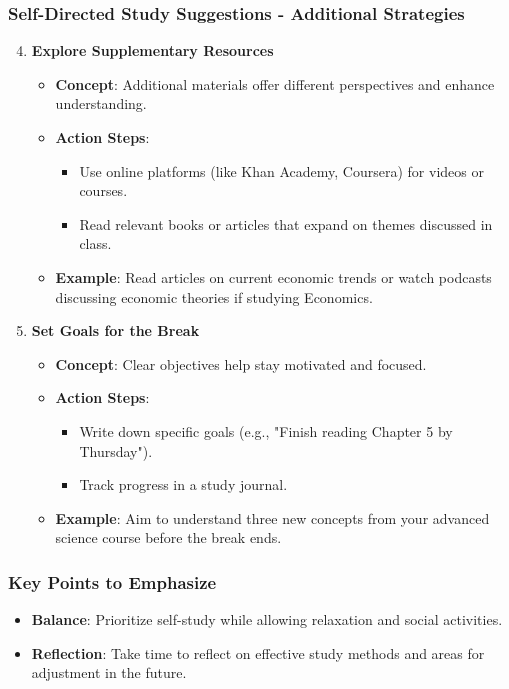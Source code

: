 \documentclass[aspectratio=169]{beamer}
\begin{document}
\begin{frame}[fragile]
    \frametitle{Self-Directed Study Suggestions - Additional Strategies}
    \begin{enumerate}
        \setcounter{enumi}{3}
        \item \textbf{Explore Supplementary Resources}
        \begin{itemize}
            \item \textbf{Concept}: Additional materials offer different perspectives and enhance understanding.
            \item \textbf{Action Steps}:
            \begin{itemize}
                \item Use online platforms (like Khan Academy, Coursera) for videos or courses.
                \item Read relevant books or articles that expand on themes discussed in class.
            \end{itemize}
            \item \textbf{Example}: Read articles on current economic trends or watch podcasts discussing economic theories if studying Economics.
        \end{itemize}

        \item \textbf{Set Goals for the Break}
        \begin{itemize}
            \item \textbf{Concept}: Clear objectives help stay motivated and focused.
            \item \textbf{Action Steps}:
            \begin{itemize}
                \item Write down specific goals (e.g., "Finish reading Chapter 5 by Thursday").
                \item Track progress in a study journal.
            \end{itemize}
            \item \textbf{Example}: Aim to understand three new concepts from your advanced science course before the break ends.
        \end{itemize}
    \end{enumerate}
\end{frame}

\begin{frame}[fragile]
    \frametitle{Key Points to Emphasize}
    \begin{itemize}
        \item \textbf{Balance}: Prioritize self-study while allowing relaxation and social activities.
        \item \textbf{Reflection}: Take time to reflect on effective study methods and areas for adjustment in the future.
    \end{itemize}
\end{frame}
\end{document}
